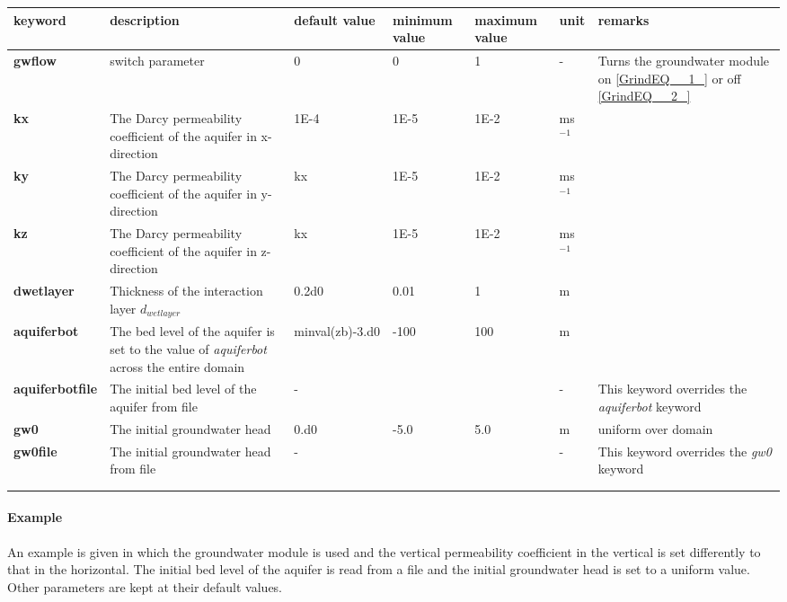 \begin{tabular}{|p{0.7in}|p{0.7in}|p{0.6in}|p{0.5in}|p{0.5in}|p{0.3in}|p{0.6in}|} \hline 
keyword\textbf{} & description & default value & minimum value & maximum value & unit & remarks \\ \hline 
\textbf{gwflow} & switch parameter & 0 & 0 & 1 & - & Turns the groundwater module on \eqref{GrindEQ__1_} or off \eqref{GrindEQ__2_} \\ \hline 
\textbf{kx} & The Darcy permeability coefficient of the aquifer in x-direction & 1E-4 & 1E-5 & 1E-2 & ms${}^{-1}$ &  \\ \hline 
\textbf{ky} & The Darcy permeability coefficient of the aquifer in y-direction & kx & 1E-5 & 1E-2 & ms${}^{-1}$ &  \\ \hline 
\textbf{kz} & The Darcy permeability coefficient of the aquifer in z-direction & kx & 1E-5 & 1E-2 & ms${}^{-1}$ &  \\ \hline 
\textbf{dwetlayer} & Thickness of the interaction layer $d_{wetlayer} $ & 0.2d0 & 0.01 & 1 & m &   \\ \hline 
\textbf{aquiferbot} & The bed level of the aquifer is set to the value of \textit{aquiferbot} across the \newline entire domain & minval(zb)-3.d0 & -100 & 100 & m &   \\ \hline 
\textbf{aquiferbotfile} & The initial bed level of the aquifer from file & - &  &  & - & This keyword overrides the \textit{aquiferbot} keyword \\ \hline 
\textbf{gw0} & The initial groundwater head  & 0.d0 & -5.0 & 5.0 & m & uniform over domain \\ \hline 
\textbf{gw0file} & The initial groundwater head from file  & - &  &  & - & This keyword overrides the \textit{gw0} keyword \\ \hline 
\textbf{} &  &  &  &  &  &  \\ \hline 
\textbf{} &  &  &  &  &  &  \\ \hline 
\end{tabular}


\paragraph{Example}

An example is given in which the groundwater module is used and the vertical permeability coefficient in the vertical is set differently to that in the horizontal. The initial bed level of the aquifer is read from a file and the initial groundwater head is set to a uniform value. Other parameters are kept at their default values.


